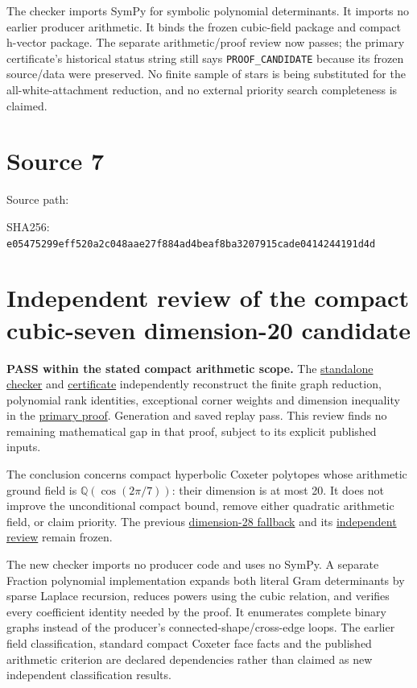 \documentclass[
  10pt,
]{report}
\begin{document}
The checker imports SymPy for symbolic polynomial determinants. It
imports no earlier producer arithmetic. It binds the frozen cubic-field
package and compact h-vector package. The separate arithmetic/proof
review now passes; the primary certificate's historical status string
still says \texttt{PROOF\_CANDIDATE} because its frozen source/data were
preserved. No finite sample of stars is being substituted for the
all-white-attachment reduction, and no external priority search
completeness is claimed.

\clearpage

\chapter{Source 7}\label{source-7}

Source path:

SHA256:
\nolinkurl{e05475299eff520a2c048aae27f884ad4beaf8ba3207915cade0414244191d4d}

\chapter{Independent review of the compact cubic-seven dimension-20
candidate}\label{independent-review-of-the-compact-cubic-seven-dimension-20-candidate}

\textbf{PASS within the stated compact arithmetic scope.} The
\href{../scripts/fresh_compact_global_bound_20261015_review.py}{standalone
checker} and
\href{fresh_compact_global_bound_20261015_review.json}{certificate}
independently reconstruct the finite graph reduction, polynomial rank
identities, exceptional corner weights and dimension inequality in the
\href{fresh_compact_global_bound_20261015.md}{primary proof}. Generation
and saved replay pass. This review finds no remaining mathematical gap
in that proof, subject to its explicit published inputs.

The conclusion concerns compact hyperbolic Coxeter polytopes whose
arithmetic ground field is \(\mathbb Q(\cos(2\pi/7))\): their dimension
is at most 20. It does not improve the unconditional compact bound,
remove either quadratic arithmetic field, or claim priority. The
previous \href{fresh_arithmetic_highdim_20261015.md}{dimension-28
fallback} and its
\href{fresh_arithmetic_highdim_20261015_review.md}{independent review}
remain frozen.

The new checker imports no producer code and uses no SymPy. A separate
Fraction polynomial implementation expands both literal Gram
determinants by sparse Laplace recursion, reduces powers using the cubic
relation, and verifies every coefficient identity needed by the proof.
It enumerates complete binary graphs instead of the producer's
connected-shape/cross-edge loops. The earlier field classification,
standard compact Coxeter face facts and the published arithmetic
criterion are declared dependencies rather than claimed as new
independent classification results.
\end{document}
